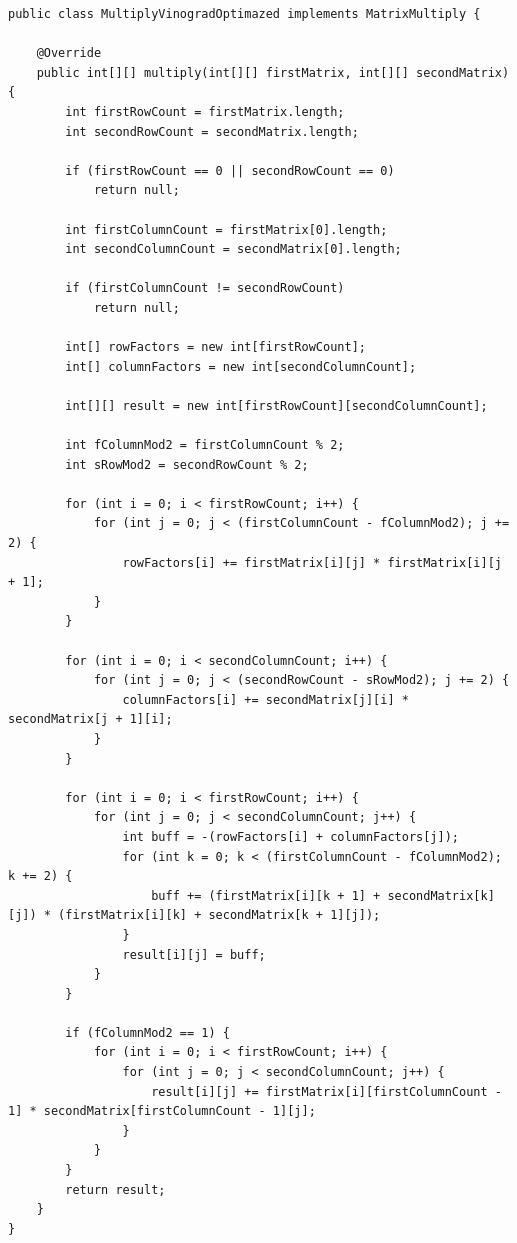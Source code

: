 \documentclass[12pt]{report}
\begin{document}
\begin{lstlisting}[label=some-code,caption=Оптимизированный алгоритм Винограда]
public class MultiplyVinogradOptimazed implements MatrixMultiply {
    
    @Override
    public int[][] multiply(int[][] firstMatrix, int[][] secondMatrix) {
        int firstRowCount = firstMatrix.length;
        int secondRowCount = secondMatrix.length;

        if (firstRowCount == 0 || secondRowCount == 0)
            return null;

        int firstColumnCount = firstMatrix[0].length;
        int secondColumnCount = secondMatrix[0].length;

        if (firstColumnCount != secondRowCount)
            return null;

        int[] rowFactors = new int[firstRowCount];
        int[] columnFactors = new int[secondColumnCount];

        int[][] result = new int[firstRowCount][secondColumnCount];

        int fColumnMod2 = firstColumnCount % 2;
        int sRowMod2 = secondRowCount % 2;

        for (int i = 0; i < firstRowCount; i++) {
            for (int j = 0; j < (firstColumnCount - fColumnMod2); j += 2) {
                rowFactors[i] += firstMatrix[i][j] * firstMatrix[i][j + 1];
            }
        }

        for (int i = 0; i < secondColumnCount; i++) {
            for (int j = 0; j < (secondRowCount - sRowMod2); j += 2) {
                columnFactors[i] += secondMatrix[j][i] * secondMatrix[j + 1][i];
            }
        }

        for (int i = 0; i < firstRowCount; i++) {
            for (int j = 0; j < secondColumnCount; j++) {
                int buff = -(rowFactors[i] + columnFactors[j]);
                for (int k = 0; k < (firstColumnCount - fColumnMod2); k += 2) {
                    buff += (firstMatrix[i][k + 1] + secondMatrix[k][j]) * (firstMatrix[i][k] + secondMatrix[k + 1][j]);
                }
                result[i][j] = buff;
            }
        }

        if (fColumnMod2 == 1) {
            for (int i = 0; i < firstRowCount; i++) {
                for (int j = 0; j < secondColumnCount; j++) {
                    result[i][j] += firstMatrix[i][firstColumnCount - 1] * secondMatrix[firstColumnCount - 1][j];
                }
            }
        }
        return result;
    }
}
\end{lstlisting}
\end{document}
